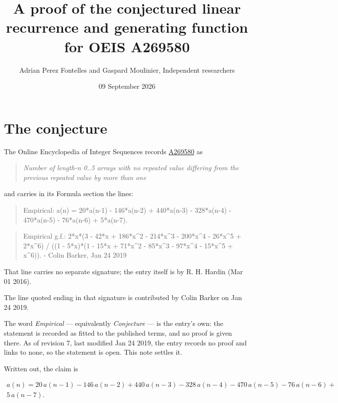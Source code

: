 \documentclass[11pt]{article}
\title{A proof of the conjectured linear recurrence and generating function for OEIS A269580}
\author{Adrian Perez Fontelles and Gaspard Moulinier, Independent researchers}
\date{09 September 2026}
\theoremstyle{definition}
\begin{document}
\maketitle
\section{The conjecture}

The Online Encyclopedia of Integer Sequences records \href{https://oeis.org/A269580}{A269580} as

\begin{quote}\itshape Number of length-n 0..5 arrays with no repeated value differing from the previous repeated value by more than one\end{quote}

and carries in its Formula section the lines:

\begin{quote}\ttfamily Empirical: a(n) = 20*a(n-1) - 146*a(n-2) + 440*a(n-3) - 328*a(n-4) - 470*a(n-5) - 76*a(n-6) + 5*a(n-7).\end{quote}

\begin{quote}\ttfamily Empirical g.f.: 2*x*(3 - 42*x + 186*x\textasciicircum{}2 - 214*x\textasciicircum{}3 - 200*x\textasciicircum{}4 - 26*x\textasciicircum{}5 + 2*x\textasciicircum{}6) / ((1 - 5*x)*(1 - 15*x + 71*x\textasciicircum{}2 - 85*x\textasciicircum{}3 - 97*x\textasciicircum{}4 - 15*x\textasciicircum{}5 + x\textasciicircum{}6)). - Colin Barker, Jan 24 2019\end{quote}

That line carries no separate signature; the entry itself is by R. H. Hardin (Mar 01 2016).

The line quoted ending in that signature is contributed by Colin Barker on Jan 24 2019.

The word {\itshape Empirical} --- equivalently {\itshape Conjecture} --- is the entry's own: the statement is recorded as fitted to the published terms, and no proof is given there. As of revision 7, last modified Jan 24 2019, the entry records no proof and links to none, so the statement is open. This note settles it.

Written out, the claim is

\begin{multline*} a(n) = 20\,a(n-1) - 146\,a(n-2) + 440\,a(n-3) - 328\,a(n-4) - 470\,a(n-5) - 76\,a(n-6) + \\ 5\,a(n-7). \end{multline*}
\end{document}
